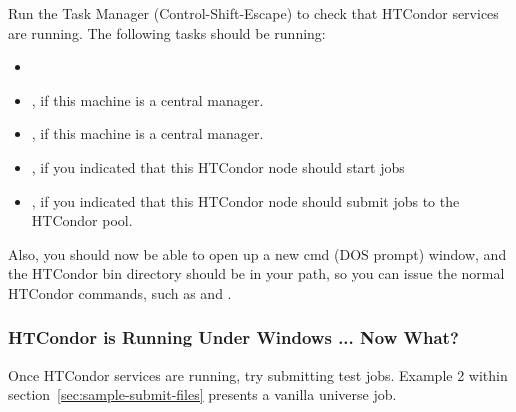 Run the Task Manager (Control-Shift-Escape) to check that HTCondor
services are running.  The following tasks should
be running:  
\begin{itemize}
\item {}
\item {}, if this machine is a central manager.
\item {}, if this machine is a central manager.
\item {}, if you indicated that this HTCondor node should start jobs
\item {}, if you indicated that this HTCondor node should submit jobs
to the HTCondor pool.
\end{itemize}

Also, you should now be able to open up a new cmd (DOS prompt) window, and
the HTCondor bin directory should be in your path, so you can issue the normal
HTCondor commands, such as  and .


\subsubsection{\label{nt-running-now-what}
HTCondor is Running Under Windows ... Now What?}

Once HTCondor services are running, try submitting test jobs.
Example 2 within section~\ref{sec:sample-submit-files} 
presents a vanilla universe job.
